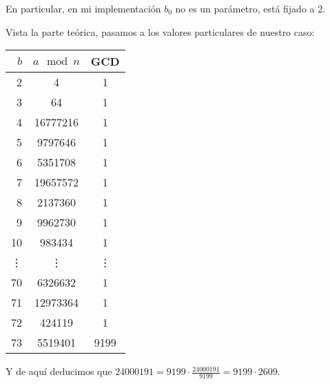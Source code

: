 \begin{enumerate}
		En particular, en mi implementación $b_0$ no es un parámetro, está fijado a 2.
		
		Vista la parte teórica, pasamos a los valores particulares de nuestro caso:
		\begin{center}
		\begin{tabular}{ | r | c | c |}
			\hline
			$b$     & $a \mod n$    & GCD \\
			\hline
			2       &  4            &  1  \\
			3       &  64           &  1  \\
			4       &  16777216     &  1  \\
			5       &  9797646      &  1  \\
			6       &  5351708      &  1  \\
			7       &  19657572     &  1  \\
			8       &  2137360      &  1  \\
			9       &  9962730      &  1  \\
			10      &  983434       &  1  \\
			\vdots  &  \vdots       &  \vdots  \\
			70      &  6326632      &  1  \\
			71      &  12973364     &  1  \\
			72      &  424119       &  1  \\
			73      &  5519401      &  9199  \\
			\hline
		\end{tabular}
		\end{center}
		
		Y de aquí deducimos que $\displaystyle 24000191 = 9199 \cdot \frac{24000191}{9199} = 9199 \cdot 2609$.
	\end{enumerate}
